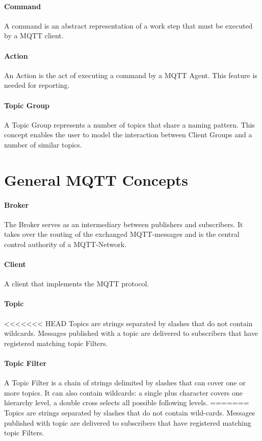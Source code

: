 \paragraph{Command}
A command is an abstract representation of a work step that must be executed by a MQTT client.

\paragraph{Action}
An Action is the act of executing a command by a MQTT Agent.
This feature is needed for reporting.

\paragraph{Topic Group}
A Topic Group represents a number of topics that share a naming pattern.
This concept enables the user to model the interaction between Client Groups and a number of similar topics.

\section{General MQTT Concepts}
\paragraph{Broker}
The Broker serves as an intermediary between publishers and subscribers.
It takes over the routing of the exchanged MQTT-messages and is the central control authority of a MQTT-Network.
\paragraph{Client}
A client that implements the MQTT protocol. 
\paragraph{Topic}
<<<<<<< HEAD
Topics are strings separated by slashes that do not contain wildcards.
Messages published with a topic are delivered to subscribers that have registered matching topic Filters.
\paragraph{Topic Filter}
A Topic Filter is a chain of strings delimited by slashes that 
can cover one or more topics. 
It can also contain wildcards: a single plus character covers one hierarchy level, a double cross selects all possible following levels.
=======
Topics are strings separated by slashes that do not contain wild-cards.
Messages published with topic are delivered to subscribers that have registered matching topic Filters.
